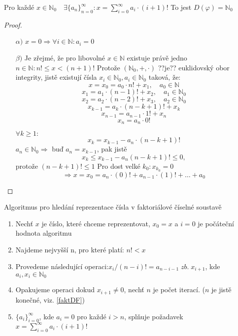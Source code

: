 \documentclass[czech,bachelor,dept470,male]{diploma}
\newcommand{\posla}{\{a_i\}_{i=0}^{\infty}}
\begin{document}
\begin{theorem}
	Pro každé $x \in \mathbb{N}_0 \quad \exists\{a_n\}_{n=0}^\infty:x=
	\sum_{i=0}^{\infty}a_i\cdot(i+1)!$
	To jest $D(\varphi)=\mathbb{N}_0$
\end{theorem}
\begin{proof}\label{faktDF}
	\begin{enumerate}
		\item[$\alpha)$] $x=0 \Rightarrow \forall i \in \mathbb{N}:a_i=0$
		\item[$\beta)$] Je zřejmé, že pro libovolné $x \in \mathbb{N}$ existuje právě jedno $n\in\mathbb{N}:n!\le x<(n+1)!$\newline
		Protože $(\mathbb{N}_0,+,\cdot)$ ??je?? euklidovský obor integrity, jistě existují čísla $x_i\in\mathbb{N}_0, a_i\in\mathbb{N}_0$ taková, že:
		$$ x = x_0 = a_0 \cdot n! + x_1,\quad a_0 \in \mathbb{N}$$
		$$ x_1 = a_1 \cdot(n-1)! + x_2,\quad a_1 \in \mathbb{N}_0$$
		$$ x_2 = a_2 \cdot(n-2)! + x_3,\quad a_2 \in \mathbb{N}_0$$
		$$ x_{k-1} = a_k \cdot (n-k+1)! + x_{k}$$
		$$ x_{n-1} = a_{n-1} \cdot 1! + x_{n}$$
		$$ x_{n} = a_{n} \cdot 0!$$
		
		$\forall k \ge 1:$
		$$x_k=x_{k-1}-a_n\cdot(n-k+1)!$$
		$a_n \in \mathbb{N}_0 \Rightarrow$ buď $a_n = x_{k-1}$, pak jistě
		$$x_k \le x_{k-1}-a_n(n-k+1)! \le 0,$$
		protože $(n-k+1)! \le 1$\newline
		Pro dost velké $k_0: x_{k_0} = 0$
		$$\Rightarrow x = x_0 = a_n\cdot(0)!+a_{n-1}\cdot(1)!+\dots+a_0$$
	\end{enumerate}
\end{proof}
\begin{remark} Algoritmus pro hledání reprezentace čísla v faktoriálové číselné soustavě
	\begin{enumerate}
		\item Nechť $x$ je číslo, které chceme reprezentovat, $x_0 = x$ a $i=0$ je počáteční hodnota algoritmu
		\item Najdeme nejvyšší n, pro které platí: $n! < x$		
		\item Provedeme následující operaci:\newline $x_i/(n-i)!=a_{n-i-1}\;zb.\;x_{i+1}$, kde $ a_i,x_i\in\mathbb{N}_0$
		\item Opakujeme operaci dokud $x_{i+1}\ne0$, nechť $n$ je počet iterací. ($n$ je jistě konečné, viz. \ref{faktDF})
		\item $\posla$, kde $a_i=0$ pro každé $i>n$, splňuje požadavek $x=
		\sum_{i=0}^{\infty}a_i\cdot(i+1)!$
	\end{enumerate}
\end{remark}
\end{document}
